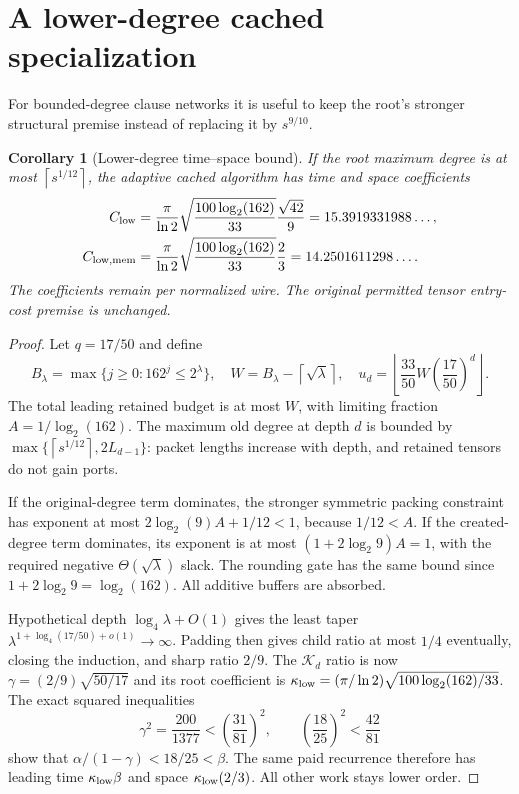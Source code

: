 \documentclass[11pt]{article}
\newtheorem{corollary}[theorem]{Corollary}
\theoremstyle{definition}\newtheorem{definition}[theorem]{Definition}
\theoremstyle{remark}\newtheorem{remark}[theorem]{Remark}
\newcommand{\floor}[1]{\left\lfloor#1\right\rfloor}
\newcommand{\ceil}[1]{\left\lceil#1\right\rceil}
\newcommand{\K}{\mathcal K}
\begin{document}
\section{A lower-degree cached specialization}
\label{sec:lowdegree}

For bounded-degree clause networks it is useful to keep the root's stronger
structural premise instead of replacing it by $s^{9/10}$.

\begin{corollary}[Lower-degree time--space bound]\label{cor:low}
If the root maximum degree is at most $\ceil{s^{1/12}}$, the adaptive cached
algorithm has time and space coefficients
\begin{align}
 C_{\rm low}&=\frac{\pi}{\ln2}
  \sqrt{\frac{100\log_2(162)}{33}}\frac{\sqrt{42}}9
  =15.3919331988\ldots,\\
 C_{\rm low,mem}&=\frac{\pi}{\ln2}
  \sqrt{\frac{100\log_2(162)}{33}}\frac23
  =14.2501611298\ldots.
\end{align}
The coefficients remain per normalized wire. The original permitted tensor
entry-cost premise is unchanged.
\end{corollary}
\begin{proof}
Let $q=17/50$ and define
\[
 B_\lambda=\max\{j\ge0:162^j\le2^\lambda\},\quad
 W=B_\lambda-\ceil{\sqrt\lambda},\quad
 u_d=\floor{\frac{33}{50}W\left(\frac{17}{50}\right)^d}.
\]
The total leading retained budget is at most $W$, with limiting fraction
$A=1/\log_2(162)$. The maximum old degree at depth $d$ is bounded by
$\max\{\ceil{s^{1/12}},2L_{d-1}\}$: packet lengths increase with depth,
and retained tensors do not gain ports.

If the original-degree term dominates, the stronger symmetric packing
constraint has exponent at most $2\log_2(9)A+1/12<1$, because $1/12<A$.
If the created-degree term dominates, its exponent is at most
$(1+2\log_2 9)A=1$, with the required negative
$\Theta(\sqrt\lambda)$ slack. The rounding gate has the same bound since
$1+2\log_2 9=\log_2(162)$. All additive buffers are absorbed.

Hypothetical depth $\log_4\lambda+O(1)$ gives the least taper
$\lambda^{1+\log_4(17/50)+o(1)}\to\infty$. Padding then gives child
ratio at most $1/4$ eventually, closing the induction, and sharp ratio $2/9$.
The $\K_d$ ratio is now
$\gamma=(2/9)\sqrt{50/17}$ and its root coefficient is
$\kappa_{\rm low}=(\pi/\ln2)\sqrt{100\log_2(162)/33}$.
The exact squared inequalities
\[
 \gamma^2=\frac{200}{1377}<\left(\frac{31}{81}\right)^2,
 \qquad \left(\frac{18}{25}\right)^2<\frac{42}{81}
\]
show that $\alpha/(1-\gamma)<18/25<\beta$. The same paid recurrence
therefore has leading time $\kappa_{\rm low}\beta$ and space
$\kappa_{\rm low}(2/3)$. All other work stays lower order.
\end{proof}
\end{document}

